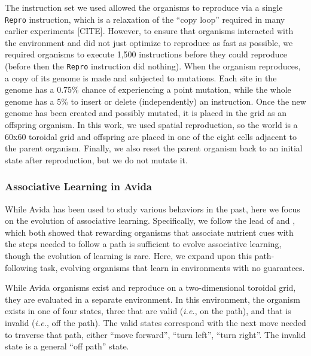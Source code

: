 The instruction set we used allowed the organisms to reproduce via a single \texttt{Repro} instruction, which is a relaxation of the ``copy loop'' required in many earlier experiments [CITE].
However, to ensure that organisms interacted with the environment and did not just optimize to reproduce as fast as possible, we required organisms to execute 1,500 instructions before they could reproduce (before then the \texttt{Repro} instruction did nothing). 
When the organism reproduces, a copy of its genome is made and subjected to mutations. 
Each site in the genome has a 0.75\% chance of experiencing a point mutation, while the whole genome has a 5\% to insert or delete (independently) an instruction. 
Once the new genome has been created and possibly mutated, it is placed in the grid as an offspring organism. 
In this work, we used spatial reproduction, so the world is a 60x60 toroidal grid and offspring are placed in one of the eight cells adjacent to the parent organism. 
Finally, we also reset the parent organism back to an initial state after reproduction, but we do not mutate it. 

\subsubsection{Associative Learning in Avida}
\label{subsub:avida:learning}

While Avida has been used to study various behaviors in the past, here we focus on the evolution of associative learning.
Specifically, we follow the lead of \cite{pontesEvolutionaryOriginAssociative2020} and \cite{fergusonPotentiatingMutationsFacilitate2023}, which both showed that rewarding organisms that associate nutrient cues with the steps needed to follow a path is sufficient to evolve associative learning, though the evolution of learning is rare. 
Here, we expand upon this path-following task, evolving organisms that learn in environments with no guarantees. 

While Avida organisms exist and reproduce on a two-dimensional toroidal grid, they are evaluated in a separate environment. 
In this environment, the organism exists in one of four states, three that are valid (\textit{i.e.}, on the path), and that is invalid (\textit{i.e.}, off the path). 
The valid states correspond with the next move needed to traverse that path, either 
``move forward'', ``turn left'', ``turn right''. 
The invalid state is a general ``off path'' state. 

